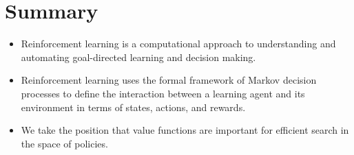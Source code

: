 \documentclass{article}
\begin{document}
\section{Summary}
\begin{itemize}
    \item Reinforcement learning is a computational approach to understanding and automating goal-directed learning and decision making.
    \item Reinforcement learning uses the formal framework of Markov decision processes to define the interaction between a learning agent and its environment in terms of states, actions, and rewards.
    \item We take the position that value functions are important for efficient search in the space of policies.
\end{itemize}
\end{document}
